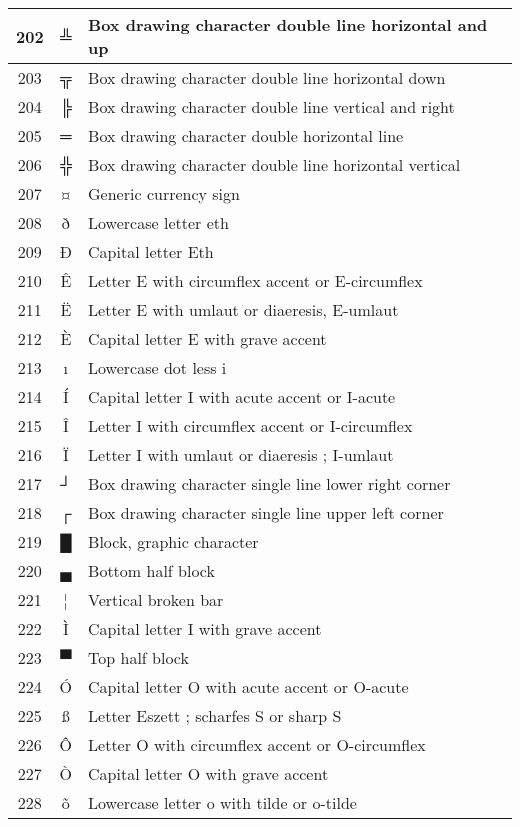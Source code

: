 {\begin{center}
\begin{longtable}{|c|c|l|}
202 & ╩ & Box drawing character double line horizontal and up \\\hline
203 & ╦ & Box drawing character double line horizontal down \\\hline
204 & ╠ & Box drawing character double line vertical and right \\\hline
205 & ═ & Box drawing character double horizontal line \\\hline
206 & ╬ & Box drawing character double line horizontal vertical \\\hline
207 & ¤ & Generic currency sign \\\hline
208 & ð & Lowercase letter eth \\\hline
209 & Ð & Capital letter Eth \\\hline
210 & Ê & Letter E with circumflex accent or E-circumflex \\\hline
211 & Ë & Letter E with umlaut or diaeresis, E-umlaut \\\hline
212 & È & Capital letter E with grave accent \\\hline
213 & ı & Lowercase dot less i \\\hline
214 & Í & Capital letter I with acute accent or I-acute \\\hline
215 & Î & Letter I with circumflex accent or I-circumflex \\\hline
216 & Ï & Letter I with umlaut or diaeresis ; I-umlaut \\\hline
217 & ┘ & Box drawing character single line lower right corner \\\hline
218 & ┌ & Box drawing character single line upper left corner \\\hline
219 & █ & Block, graphic character \\\hline
220 & ▄ & Bottom half block \\\hline
221 & ¦ & Vertical broken bar \\\hline
222 & Ì & Capital letter I with grave accent \\\hline
223 & ▀ & Top half block \\\hline
224 & Ó & Capital letter O with acute accent or O-acute \\\hline
225 & ß & Letter Eszett ; scharfes S or sharp S \\\hline
226 & Ô & Letter O with circumflex accent or O-circumflex \\\hline
227 & Ò & Capital letter O with grave accent \\\hline
228 & õ & Lowercase letter o with tilde or o-tilde \\\hline

\end{longtable}
\end{center}}
